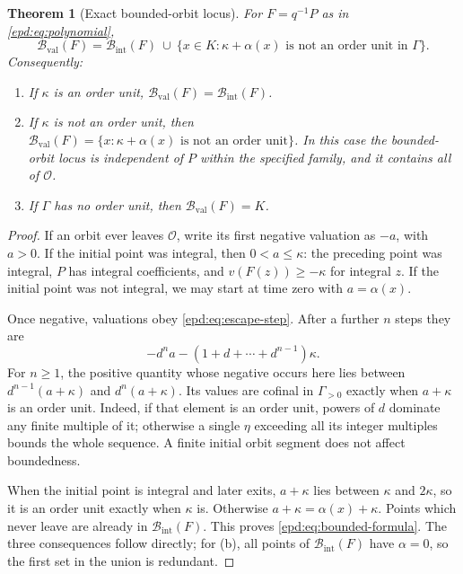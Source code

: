 \documentclass[11pt,a4paper]{article}
\numberwithin{equation}{section}
\newtheorem{theorem}{Theorem}[section]
\theoremstyle{plain}
\theoremstyle{definition}
\theoremstyle{remark}
\newcommand{\OO}{\mathcal O}
\newcommand{\BI}{\mathcal B_{\mathrm{int}}}
\newcommand{\BV}{\mathcal B_{\mathrm{val}}}
\begin{document}
\begin{theorem}[Exact bounded-orbit locus]\label{epd:thm:bounded}
For $F=q^{-1}P$ as in \eqref{epd:eq:polynomial},
\begin{equation}\label{epd:eq:bounded-formula}
 \BV(F)=\BI(F)\ \cup\
 \{x\in K:\kappa+\alpha(x)\text{ is not an order unit in }\Gamma\}.
\end{equation}
Consequently:
\begin{enumerate}[label=\textup{(\alph*)},leftmargin=2em]
\item If $\kappa$ is an order unit, $\BV(F)=\BI(F)$.
\item If $\kappa$ is not an order unit, then
$\BV(F)=\{x:\kappa+\alpha(x)\text{ is not an order unit}\}$.
In this case the bounded-orbit locus is independent of $P$ within the
specified family, and it contains all of $\OO$.
\item If $\Gamma$ has no order unit, then $\BV(F)=K$.
\end{enumerate}
\end{theorem}
\begin{proof}
If an orbit ever leaves $\OO$, write its first negative valuation as
$-a$, with $a>0$. If the initial point was integral, then $0<a\leq\kappa$:
the preceding point was integral, $P$ has integral coefficients, and
$v(F(z))\geq-\kappa$ for integral $z$. If the initial point was not
integral, we may start at time zero with $a=\alpha(x)$.

Once negative, valuations obey \eqref{epd:eq:escape-step}. After a further
$n$ steps they are
\begin{equation}\label{epd:eq:outside-recurrence}
 -d^n a-(1+d+\cdots+d^{n-1})\kappa.
\end{equation}
For $n\geq1$, the positive quantity whose negative occurs here lies
between $d^{n-1}(a+\kappa)$ and $d^n(a+\kappa)$. Its values are
cofinal in $\Gamma_{>0}$ exactly when $a+\kappa$ is an order unit.
Indeed, if that element is an order unit, powers of $d$ dominate any finite
multiple of it; otherwise a single $\eta$ exceeding all its integer
multiples bounds the whole sequence. A finite initial orbit segment
does not affect boundedness.

When the initial point is integral and later exits, $a+\kappa$ lies
between $\kappa$ and $2\kappa$, so it is an order unit exactly when $\kappa$
is. Otherwise $a+\kappa=\alpha(x)+\kappa$. Points which never leave
are already in $\BI(F)$. This proves \eqref{epd:eq:bounded-formula}.
The three consequences follow directly; for (b), all points of
$\BI(F)$ have $\alpha=0$, so the first set in the union is redundant.
\end{proof}
\end{document}
